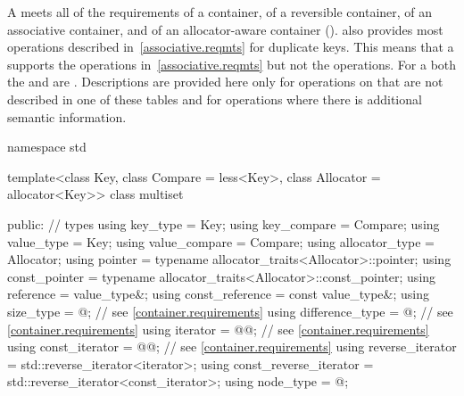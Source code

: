 \pnum
A  meets all of the requirements of a container, of a
reversible container, of an associative
container, and of an allocator-aware container
().
also provides most operations described in~\ref{associative.reqmts}
for duplicate keys.
This means that a
supports the
operations in~\ref{associative.reqmts}
but not the
operations.
For a
both the
and
are
.
Descriptions are provided here only for operations on
that are not described in one of these tables
and for operations where there is additional semantic information.

\begin{codeblock}
namespace std {
  template<class Key, class Compare = less<Key>,
           class Allocator = allocator<Key>>
  class multiset {
  public:
    // types
    using key_type               = Key;
    using key_compare            = Compare;
    using value_type             = Key;
    using value_compare          = Compare;
    using allocator_type         = Allocator;
    using pointer                = typename allocator_traits<Allocator>::pointer;
    using const_pointer          = typename allocator_traits<Allocator>::const_pointer;
    using reference              = value_type&;
    using const_reference        = const value_type&;
    using size_type              = @\impdef@; // see \ref{container.requirements}
    using difference_type        = @\impdef@; // see \ref{container.requirements}
    using iterator               = @@; // see \ref{container.requirements}
    using const_iterator         = @@; // see \ref{container.requirements}
    using reverse_iterator       = std::reverse_iterator<iterator>;
    using const_reverse_iterator = std::reverse_iterator<const_iterator>;
    using node_type              = @\unspec@;

}}
\end{codeblock}
